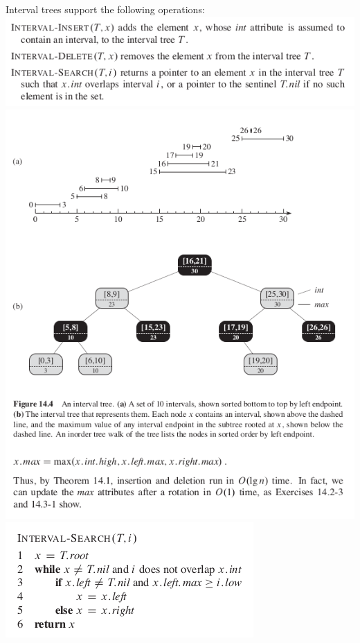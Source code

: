 \documentclass[11pt]{article}
\begin{document}
Interval trees support the following operations: \\
\includegraphics[width=.9\linewidth]{pics/c14_interval_tree_op.png} \\

\includegraphics[width=.9\linewidth]{pics/c14_interval_tree_fig.png} \\

\includegraphics[width=.9\linewidth]{pics/c14_interval_search.png} \\
\end{document}
